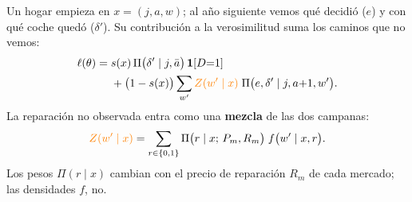 \documentclass[border=0pt]{standalone}
\newcommand{\no}[1]{{\color{orange}#1}}
\begin{document}
\begin{minipage}{26.783cm}\fontsize{27}{33.5}\selectfont\raggedright 
Un hogar empieza en $x=(j,a,w)$; al año siguiente vemos qué decidió ($e$) y con qué
coche quedó ($\delta'$). Su contribución a la verosimilitud suma los caminos que no
vemos:
\[ \begin{aligned} \ell(\theta)=\;&s(x)\,\Pi\big(\delta'\mid j,\bar a\big)\,\mathbf{1}[D{=}1]\\
   &+\big(1-s(x)\big)\sum_{w'}\no{Z(w'\mid x)}\;\Pi\big(e,\delta'\mid j,a{+}1,w'\big). \end{aligned} \]
La reparación no observada entra como una \textbf{mezcla} de las dos campanas:
\[ \no{Z(w'\mid x)}=\sum_{r\in\{0,1\}}\Pi\big(r\mid x;\,P_m,R_m\big)\;
   f\big(w'\mid x,r\big). \]
Los pesos $\Pi(r\mid x)$ cambian con el precio de reparación $R_m$ de cada mercado;
las densidades $f$, no.
\end{minipage}
\end{document}

